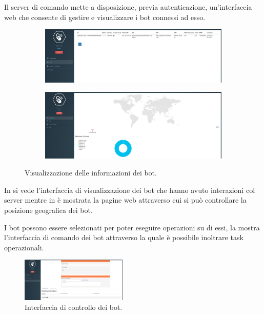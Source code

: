 Il server di comando mette a disposizione, previa autenticazione, un'interfaccia web che consente di gestire e visualizzare i bot connessi ad esso.
\begin{figure}[hbtp]
    \centering
    \begin{subfigure}{0.45\textwidth}
        \centering
        \includegraphics[width=\textwidth,height=0.45\textwidth]{res/fig/uboat-home.png}
        \caption{}
        \label{fig:uboat-home-1}
    \end{subfigure}
    \begin{subfigure}{0.45\textwidth}
        \centering
        \includegraphics[width=\textwidth,height=0.45\textwidth]{res/fig/uboat-map.png}
        \caption{}
        \label{fig:uboat-home-2}
    \end{subfigure}
    \caption{Visualizzazione delle informazioni dei  bot.}
    \label{fig:uboat-home}
\end{figure}

In  si vede l'interfaccia di visualizzazione dei bot che hanno avuto interazioni col server mentre in  è mostrata la pagine web attraverso cui si può controllare la posizione geografica dei bot.

I bot possono essere selezionati per poter eseguire operazioni su di essi, la  mostra l'interfaccia di comando dei bot attraverso la quale è possibile inoltrare task operazionali.
\begin{figure}[hbtp]
    \centering
    \includegraphics[width=0.45\textwidth]{res/fig/uboat-control.png}
    \caption{Interfaccia di controllo dei bot.}
    \label{fig:uboat-control}
\end{figure}

